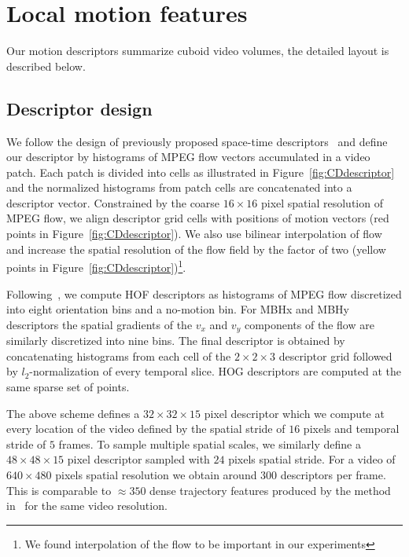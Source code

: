 \documentclass[10pt,twocolumn,letterpaper]{article}
\begin{document}
\section{Local motion features}
\label{sec:features}
Our motion descriptors summarize cuboid video volumes, the detailed layout is described below.

\subsection{Descriptor design}
We follow the design of previously proposed space-time descriptors~\cite{Laptev08,Wang12} and define our descriptor by histograms of MPEG flow vectors accumulated in a video patch. Each patch is divided into cells as illustrated in Figure~\ref{fig:CDdescriptor} and the normalized histograms from patch cells are concatenated into a descriptor vector. Constrained by the coarse $16\times16$ pixel spatial resolution of MPEG flow, we align descriptor grid cells with positions of motion vectors (red points in Figure~\ref{fig:CDdescriptor}). We also use bilinear interpolation of flow and increase the spatial resolution of the flow field by the factor of two (yellow points in Figure~\ref{fig:CDdescriptor})\footnote{We found interpolation of the flow to be important in our experiments}. 

Following~\cite{Wang12}, we compute HOF descriptors as histograms of MPEG flow discretized into eight orientation bins and a no-motion bin. For MBHx and MBHy descriptors the spatial gradients of the $v_x$ and $v_y$ components of the flow are similarly discretized into nine bins. %
The final descriptor is obtained by concatenating histograms from each cell of the $2\times2\times3$ descriptor grid followed by $l_2$-normalization of every temporal slice. HOG descriptors are computed at the same sparse set of points.

The above scheme defines a $32\times32\times15$ pixel descriptor which we compute at every location of the video defined by the spatial stride of $16$ pixels and temporal stride of $5$ frames. To sample multiple spatial scales, we similarly define a $48\times48\times15$ pixel descriptor sampled with $24$ pixels spatial stride. For a video of $640\times480$ pixels spatial resolution we obtain around 300 descriptors per frame. This is comparable to $\approx350$ dense trajectory features produced by the method in~\cite{Wang12} for the same video resolution.
\end{document}
